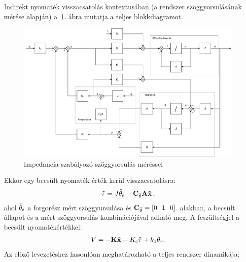 Indirekt nyomaték visszacsatolás kontextusában (a rendszer szöggyorsulásának mérése alapján) 
a~\ref{fig:block_diagram_indirect_compensation}. ábra mutatja a teljes blokkdiagramot.
\begin{figure}[ht]
    \begin{center}
    \includegraphics[width=\textwidth]{images/compensated_position_controller_angular_acceleration.pdf}
    \caption{Impedancia szabályozó szöggyorsulás méréssel}\label{fig:block_diagram_indirect_compensation}
    \end{center}
\end{figure}
Ekkor egy becsült nyomaték érték kerül visszacsatolásra:
\begin{align}
    \tilde \tau = J \ddot \theta_{\mathrm{s}} - \mathbf{C}_{\ddot\theta} \mathbf{A} \tilde{\mathbf{x}}\,,
\end{align}
ahol \(\ddot \theta_{\mathrm{s}}\) a forgorész mért szöggyursulása és \(\mathbf{C}_{\ddot\theta} = [0~~1~~0]\).
alakban, a becsült állapot és a mért szöggyorsulás kombinációjával adható meg.
A feszültségjel a becsült nyomatékértékkel:
\begin{align}
    V = -\mathbf{K} \tilde{\mathbf{x}} -K_c \tilde \tau + k_1 \theta_r.
\end{align}
Az előző levezetéshez hasonlóan meghatározható a teljes rendszer dinamikája:
